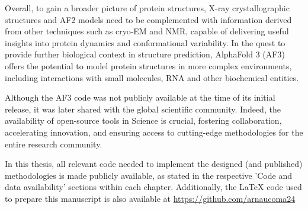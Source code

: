 Overall, to gain a broader picture of protein structures, X-ray crystallographic structures and AF2 models need to be complemented with information derived from other techniques such as cryo-EM and NMR, capable of delivering useful insights into protein dynamics and conformational variability. In the quest to provide further biological context in structure prediction, AlphaFold 3 (AF3) offers the potential to model protein structures in more complex environments, including interactions with small molecules, RNA and other biochemical entities\cite{abramson_accurate_2024}.

Although the AF3 code was not publicly available at the time of its initial release\cite{abramson_accurate_2024}, it was later shared with the global scientific community\cite{callaway_ai_2024}. Indeed, the availability of open-source tools in Science is crucial, fostering collaboration, accelerating innovation, and ensuring access to cutting-edge methodologies for the entire research community. 

In this thesis, all relevant code needed to implement the designed (and published) methodologies is made publicly available, as stated in the respective 'Code and data availability' sections within each chapter. Additionally, the LaTeX code used to prepare this manuscript is also available at \href{https://github.com/arnaucoma24}{https://github.com/arnaucoma24}




